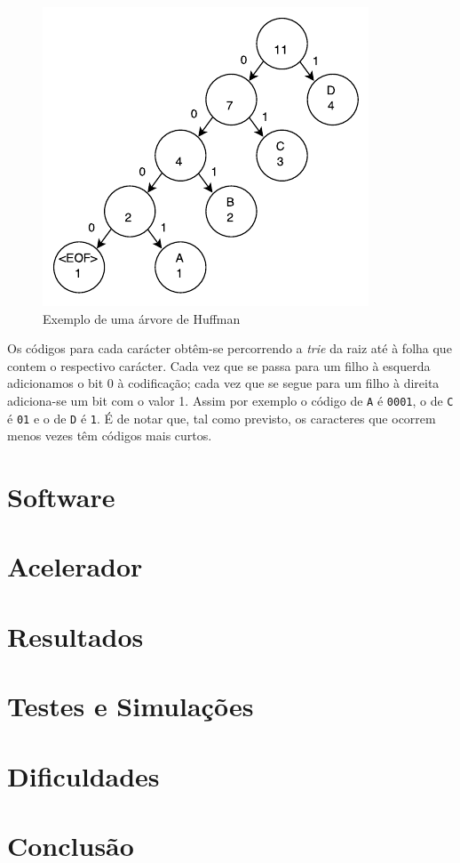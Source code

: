 \documentclass[a4paper]{article}
\begin{document}
	\begin{figure}[h]
		\centering
		\includegraphics[width=.65\textwidth]{img/huffman_tree_example}
		\caption{Exemplo de uma árvore de Huffman}
		\label{fig:huffman_tree_example}
	\end{figure}
	
	Os códigos para cada carácter obtêm-se percorrendo a \textit{trie} da raiz até à folha que contem o respectivo carácter. Cada vez que se passa para um filho à esquerda adicionamos o bit 0 à codificação; cada vez que se segue para um filho à direita adiciona-se um bit com o valor 1. Assim por exemplo o código de \texttt{A} é \texttt{0001}, o de \texttt{C} é \texttt{01} e o de \texttt{D} é \texttt{1}. É de notar que, tal como previsto, os caracteres que ocorrem menos vezes têm códigos mais curtos.
	
	\section{Software}
	
	\section{Acelerador}
	
	\section{Resultados}
	
	\section{Testes e Simulações}
	
	\section{Dificuldades}	
	
	\section{Conclusão}


\end{document}

